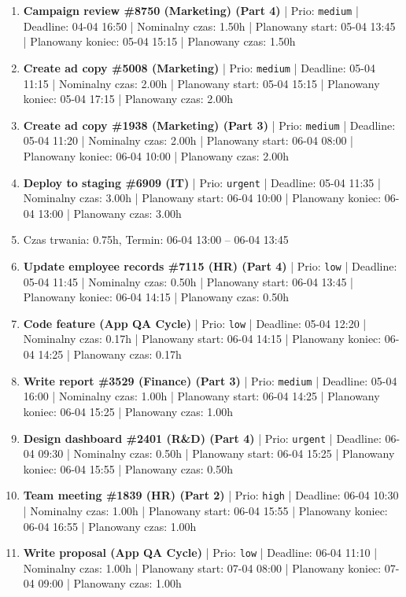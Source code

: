 {\begin{enumerate}
  \item [\textbf{14632}] \textbf{Campaign review \#8750 (Marketing) (Part 4)} | Prio: \texttt{medium} | Deadline: 04-04 16:50 | Nominalny czas: 1.50h | Planowany start: 05-04 13:45 | Planowany koniec: 05-04 15:15 | Planowany czas: 1.50h
  \item [\textbf{14666}] \textbf{Create ad copy \#5008 (Marketing)} | Prio: \texttt{medium} | Deadline: 05-04 11:15 | Nominalny czas: 2.00h | Planowany start: 05-04 15:15 | Planowany koniec: 05-04 17:15 | Planowany czas: 2.00h
  \item [\textbf{14652}] \textbf{Create ad copy \#1938 (Marketing) (Part 3)} | Prio: \texttt{medium} | Deadline: 05-04 11:20 | Nominalny czas: 2.00h | Planowany start: 06-04 08:00 | Planowany koniec: 06-04 10:00 | Planowany czas: 2.00h
  \item [\textbf{14597}] \textbf{Deploy to staging \#6909 (IT)} | Prio: \texttt{urgent} | Deadline: 05-04 11:35 | Nominalny czas: 3.00h | Planowany start: 06-04 10:00 | Planowany koniec: 06-04 13:00 | Planowany czas: 3.00h
  \item [\textbf{PRZERWA}] Czas trwania: 0.75h, Termin: 06-04 13:00 -- 06-04 13:45
  \item [\textbf{14701}] \textbf{Update employee records \#7115 (HR) (Part 4)} | Prio: \texttt{low} | Deadline: 05-04 11:45 | Nominalny czas: 0.50h | Planowany start: 06-04 13:45 | Planowany koniec: 06-04 14:15 | Planowany czas: 0.50h
  \item [\textbf{14703}] \textbf{Code feature (App QA Cycle)} | Prio: \texttt{low} | Deadline: 05-04 12:20 | Nominalny czas: 0.17h | Planowany start: 06-04 14:15 | Planowany koniec: 06-04 14:25 | Planowany czas: 0.17h
  \item [\textbf{14672}] \textbf{Write report \#3529 (Finance) (Part 3)} | Prio: \texttt{medium} | Deadline: 05-04 16:00 | Nominalny czas: 1.00h | Planowany start: 06-04 14:25 | Planowany koniec: 06-04 15:25 | Planowany czas: 1.00h
  \item [\textbf{14603}] \textbf{Design dashboard \#2401 (R\&D) (Part 4)} | Prio: \texttt{urgent} | Deadline: 06-04 09:30 | Nominalny czas: 0.50h | Planowany start: 06-04 15:25 | Planowany koniec: 06-04 15:55 | Planowany czas: 0.50h
  \item [\textbf{14610}] \textbf{Team meeting \#1839 (HR) (Part 2)} | Prio: \texttt{high} | Deadline: 06-04 10:30 | Nominalny czas: 1.00h | Planowany start: 06-04 15:55 | Planowany koniec: 06-04 16:55 | Planowany czas: 1.00h
  \item [\textbf{14695}] \textbf{Write proposal (App QA Cycle)} | Prio: \texttt{low} | Deadline: 06-04 11:10 | Nominalny czas: 1.00h | Planowany start: 07-04 08:00 | Planowany koniec: 07-04 09:00 | Planowany czas: 1.00h

\end{enumerate}}
